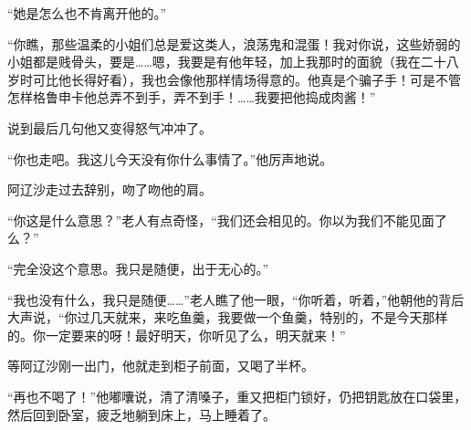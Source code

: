 \par “她是怎么也不肯离开他的。”
\par “你瞧，那些温柔的小姐们总是爱这类人，浪荡鬼和混蛋！我对你说，这些娇弱的小姐都是贱骨头，要是……嗯，我要是有他年轻，加上我那时的面貌（我在二十八岁时可比他长得好看），我也会像他那样情场得意的。他真是个骗子手！可是不管怎样格鲁申卡他总弄不到手，弄不到手！……我要把他捣成肉酱！”
\par 说到最后几句他又变得怒气冲冲了。
\par “你也走吧。我这儿今天没有你什么事情了。”他厉声地说。
\par 阿辽沙走过去辞别，吻了吻他的肩。
\par “你这是什么意思？”老人有点奇怪，“我们还会相见的。你以为我们不能见面了么？”
\par “完全没这个意思。我只是随便，出于无心的。”
\par “我也没有什么，我只是随便……”老人瞧了他一眼，“你听着，听着，”他朝他的背后大声说，“你过几天就来，来吃鱼羹，我要做一个鱼羹，特别的，不是今天那样的。你一定要来的呀！最好明天，你听见了么，明天就来！”
\par 等阿辽沙刚一出门，他就走到柜子前面，又喝了半杯。
\par “再也不喝了！”他嘟囔说，清了清嗓子，重又把柜门锁好，仍把钥匙放在口袋里，然后回到卧室，疲乏地躺到床上，马上睡着了。
